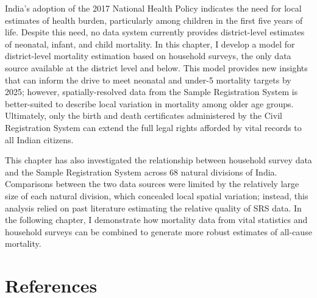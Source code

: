 \documentclass[
]{article}
\begin{document}
India's adoption of the 2017 National Health Policy indicates the need for local estimates of health burden, particularly among children in the first five years of life. Despite this need, no data system currently provides district-level estimates of neonatal, infant, and child mortality. In this chapter, I develop a model for district-level mortality estimation based on household surveys, the only data source available at the district level and below. This model provides new insights that can inform the drive to meet neonatal and under-5 mortality targets by 2025; however, spatially-resolved data from the Sample Registration System is better-suited to describe local variation in mortality among older age groups. Ultimately, only the birth and death certificates administered by the Civil Registration System can extend the full legal rights afforded by vital records to all Indian citizens.

This chapter has also investigated the relationship between household survey data and the Sample Registration System across 68 natural divisions of India. Comparisons between the two data sources were limited by the relatively large size of each natural division, which concealed local spatial variation; instead, this analysis relied on past literature estimating the relative quality of SRS data. In the following chapter, I demonstrate how mortality data from vital statistics and household surveys can be combined to generate more robust estimates of all-cause mortality.

\hypertarget{references}{%
\section{References}\label{references}}
\end{document}
